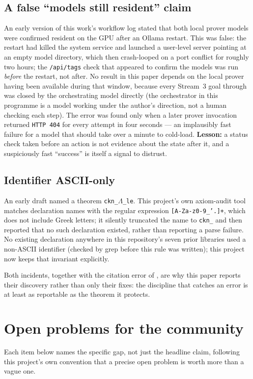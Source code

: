 \documentclass[11pt,a4paper]{article}
\theoremstyle{remark}
\begin{document}
\subsection{A false ``models still resident'' claim}
An early version of this work's workflow log stated that both local prover models were confirmed
resident on the GPU after an Ollama restart. This was false: the restart had killed the system
service and launched a user-level server pointing at an empty model directory, which then
crash-looped on a port conflict for roughly two hours; the \texttt{/api/tags} check that appeared
to confirm the models was run \emph{before} the restart, not after. No result in this paper depends
on the local prover having been available during that window, because every Stream~3 goal through
 was closed by the orchestrating model directly (the orchestrator in this
programme is a model working under the author's direction, not a human checking each step). The error was found only when a
later prover invocation returned \texttt{HTTP~404} for every attempt in four seconds --- an
implausibly fast failure for a model that should take over a minute to cold-load. \textbf{Lesson:}
a status check taken before an action is not evidence about the state after it, and a suspiciously
fast ``success'' is itself a signal to distrust.

\subsection{Identifier ASCII-only}
An early draft named a theorem \texttt{ckn\_$\Lambda$\_le}. This project's own axiom-audit tool
matches declaration names with the regular expression \texttt{[A-Za-z0-9\_'.]+}, which does not
include Greek letters; it silently truncated the name to \texttt{ckn\_} and then reported that no
such declaration existed, rather than reporting a parse failure. No existing declaration anywhere
in this repository's seven prior libraries used a non-ASCII identifier (checked by grep before
this rule was written); this project now keeps that invariant explicitly.

Both incidents, together with the citation error of , are why this paper reports
their discovery rather than only their fixes: the discipline that catches an error is at least as
reportable as the theorem it protects.

\section{Open problems for the community}
\label{sec:open}
Each item below names the specific gap, not just the headline claim, following this project's
own convention that a precise open problem is worth more than a vague one.
\end{document}
